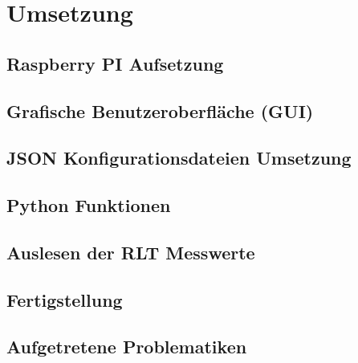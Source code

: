 \ifoot{\pezze}
\chapter{Umsetzung} 

\section{Raspberry PI Aufsetzung}


\newpage
\ifoot{\pezze}
\section{Grafische Benutzeroberfläche (GUI)}\label{gui_design}



\newpage
\ifoot{\pezze}
\section{JSON Konfigurationsdateien Umsetzung}
%


\newpage
\ifoot{\schneider}


\newpage
\ifoot{\pezze}
\section{Python Funktionen}


\newpage
\ifoot{\schneider}
\section{Auslesen der RLT Messwerte}


\section{Fertigstellung}



\newpage
\ifoot{\pezze}



\newpage
\ifoot{\mangeng}
\section{Aufgetretene Problematiken}

